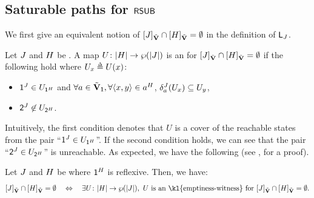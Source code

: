 \subsection{Saturable paths for $\mathsf{RSUB}$}\label{section: saturable path}
We first give an equivalent notion of $\ljump{\graph[3]}_{\tilde{\vsig}} \cap \ljump{\graph[2]}_{\tilde{\vsig}} = \emptyset$ in the definition of $\const{L}_{\graph[3]}$.
\begin{definition}\label{definition: witness}
    Let $\graph[3]$ and $\graph[2]$ be .
    A map $U \colon \domain{\graph[2]} \to \wp(\domain{\graph[3]})$ is an \intro*{} for $\ljump{\graph[3]}_{\tilde{\vsig}} \cap \ljump{\graph[2]}_{\tilde{\vsig}} = \emptyset$ if the following hold where $U_{x} \defeq U(x)$:
    \begin{itemize}
        \item $\src^{\graph[3]} \in U_{\src^{\graph[2]}}$ and $\forall a \in \tilde{\vsig}_{\id}, \forall \tuple{x, y} \in a^{\graph[2]}$, $\delta_{a}^{\graph[3]}(U_{x}) \subseteq U_{y}$,
        \item $\tgt^{\graph[3]} \not\in U_{\tgt^{\graph[2]}}$.    \lipicsEnd
    \end{itemize}
\end{definition}
Intuitively, the first condition denotes that $U$ is a cover of the reachable states from the pair ``$\src^{\graph[3]} \in U_{\src^{\graph[2]}}$''.
If the second condition holds, we can see that the pair ``$\tgt^{\graph[3]} \in U_{\tgt^{\graph[2]}}$'' is unreachable.
As expected, we have the following (see , for a proof).
\begin{proposition}\label{proposition: witness}
    Let $\graph[3]$ and $\graph[2]$ be  where $\id^{\graph[2]}$ is reflexive.
    Then, we have:
    \[\ljump{\graph[3]}_{\tilde{\vsig}} \cap \ljump{\graph[2]}_{\tilde{\vsig}} = \emptyset \quad\Leftrightarrow\quad \exists U \colon \domain{\graph[2]} \to \wp(\domain{\graph[3]}), \mbox{ $U$ is an \kl{emptiness-witness} for $\ljump{\graph[3]}_{\tilde{\vsig}} \cap \ljump{\graph[2]}_{\tilde{\vsig}} = \emptyset$}.\]
\end{proposition}

